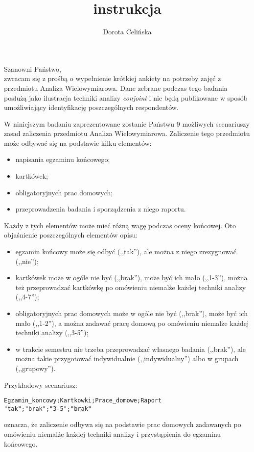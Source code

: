 \documentclass[12pt]{article}
\title{instrukcja}
\author{Dorota Celińska}
\begin{document}
\noindent Szanowni Państwo,
\vspace{0.5cm}\\
\noindent zwracam się z prośbą o wypełnienie krótkiej ankiety na potrzeby zajęć z przedmiotu Analiza Wielowymiarowa. Dane zebrane podczas tego badania posłużą jako ilustracja techniki analizy \textit{conjoint} i nie będą publikowane w sposób umożliwiający identyfikację poszczególnych respondentów.

\vspace{0.5cm}
\noindent W niniejszym badaniu zaprezentowane zostanie Państwu 9 możliwych scenariuszy zasad zaliczenia przedmiotu Analiza Wielowymiarowa. Zaliczenie tego przedmiotu może odbywać się na podstawie kilku elementów:
\begin{itemize}
 \setlength{\itemsep}{0cm}%
 \setlength{\parskip}{0cm}%
\item napisania egzaminu końcowego;
\item kartkówek;
\item obligatoryjnych prac domowych;
\item przeprowadzenia badania i sporządzenia z niego raportu.
\end{itemize}

\noindent Każdy z tych elementów może mieć różną wagę podczas oceny końcowej. Oto objaśnienie poszczególnych elementów opisu:

\begin{itemize}
 \setlength{\itemsep}{0cm}%
 \setlength{\parskip}{0cm}%
\item egzamin końcowy może się odbyć (,,tak''), ale można z niego zrezygnować (,,nie'');
\item kartkówek może w ogóle nie być (,,brak''), może być ich mało (,,1-3''), można też przeprowadzać kartkówkę po omówieniu niemalże każdej techniki analizy (,,4-7'');
\item obligatoryjnych prac domowych może w ogóle nie być (,,brak''), może być ich mało (,,1-2''), a można zadawać pracę domową po omówieniu niemalże każdej techniki analizy (,,3-5'');
\item w trakcie semestru nie trzeba przeprowadzać własnego badania (,,brak''), ale można takie przygotować indywidualnie (,,indywidualny'') albo w grupach (,,grupowy'').
\end{itemize}

\noindent Przykładowy scenariusz:
\begin{verbatim}
Egzamin_koncowy;Kartkowki;Prace_domowe;Raport
"tak";"brak";"3-5";"brak"
\end{verbatim}
\noindent oznacza, że zaliczenie odbywa się na podstawie prac domowych zadawanych po omówieniu niemalże każdej techniki analizy i przystąpienia do egzaminu końcowego.
\end{document}
